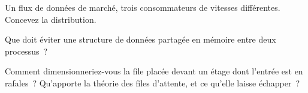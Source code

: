 \begin{interviewq}\label{iq:ll:queues-ring-buffers-and-shared-memory:4}
Un flux de données de marché, trois consommateurs de vitesses différentes. Concevez la distribution.
\end{interviewq}

\begin{interviewq}\label{iq:ll:queues-ring-buffers-and-shared-memory:5}
Que doit éviter une structure de données partagée en mémoire entre deux processus~?
\end{interviewq}

\begin{interviewq}\label{iq:ll:queues-ring-buffers-and-shared-memory:6}
Comment dimensionneriez-vous la file placée devant un étage dont l'entrée est en rafales~? Qu'apporte la théorie des files d'attente, et ce
qu'elle laisse échapper~?
\end{interviewq}
